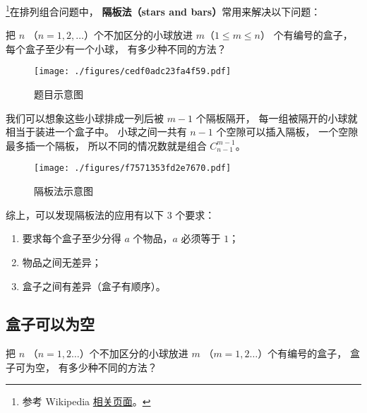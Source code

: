 

\footnote{参考 Wikipedia \href{https://en.wikipedia.org/wiki/Stars_and_bars_(combinatorics)}{相关页面}。}在排列组合问题中， \textbf{隔板法（stars and bars）}常用来解决以下问题：

\begin{example}{}
把 $n$ （$n = 1,2,\dots$）个不加区分的小球放进 $m$（$1\leqslant m\leqslant n$） 个有编号的盒子， 每个盒子至少有一个小球， 有多少种不同的方法？
\begin{figure}[ht]
\centering
\texttt{[image: ./figures/cedf0adc23fa4f59.pdf]}
\caption{题目示意图} \label{fig_BarCom_1}
\end{figure}
\end{example}

我们可以想象这些小球排成一列后被 $m-1$ 个隔板隔开， 每一组被隔开的小球就相当于装进一个盒子中。 小球之间一共有 $n-1$ 个空隙可以插入隔板， 一个空隙最多插一个隔板， 所以不同的情况数就是组合 $C_{n-1}^{m-1}$。
\begin{figure}[ht]
\centering
\texttt{[image: ./figures/f7571353fd2e7670.pdf]}
\caption{隔板法示意图} \label{fig_BarCom_2}
\end{figure}

综上，可以发现隔板法的应用有以下 $3$ 个要求：
\begin{enumerate}
\item 要求每个盒子至少分得 $a$ 个物品，$a$ 必须等于 $1$；
\item 物品之间无差异；
\item 盒子之间有差异（盒子有顺序）。
\end{enumerate}


\subsection{盒子可以为空}


\begin{example}{}
把 $n$ （$n=1,2\dots$）个不加区分的小球放进 $m$ （$m=1,2\dots$）个有编号的盒子， 盒子可为空， 有多少种不同的方法？
\end{example}


